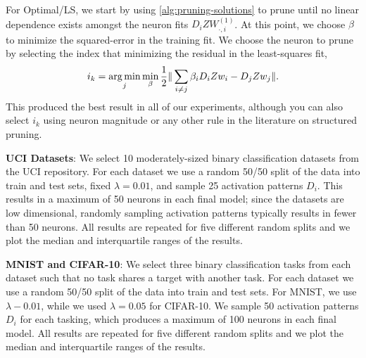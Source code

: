 For Optimal/LS, we start by using \cref{alg:pruning-solutions} to prune
until no linear dependence exists amongst the neuron fits \( D_i Z W^{(1)}_{\cdot, i} \).
At this point, we choose \( \beta \) to minimize the squared-error
in the training fit.
We choose the neuron to prune by selecting the index that minimizing the residual
in the least-squares fit,
\[
    i_k = \mathop{\rm arg\,min}_{j} \min_{\beta}
    \frac 1 2 \|\sum_{i \neq j} \beta_i D_i Z w_i  - D_j Z w_j\|.
\]
This produced the best result in all of our experiments, although you can
also select \( i_k \) using neuron magnitude or any other rule in the literature
on structured pruning.

\textbf{UCI Datasets}:
We select 10 moderately-sized binary classification datasets from the UCI repository.
For each dataset we use a random 50/50 split of the data
into train and test sets,
fixed \( \lambda = 0.01 \), and sample 25
activation patterns \( D_i \).
This results in a maximum of 50 neurons in each final model;
since the datasets are low dimensional, randomly sampling activation patterns
typically results in fewer than 50 neurons.
All results are repeated for five different random splits and we
plot the median and interquartile ranges of the results.

\textbf{MNIST and CIFAR-10}:
We select three binary classification tasks from each dataset such that
no task shares a target with another task.
For each dataset we use a random 50/50 split of the data
into train and test sets.
For MNIST, we use \( \lambda - 0.01 \), while we used \( \lambda = 0.05 \)
for CIFAR-10.
We sample 50 activation patterns \( D_i \) for each tasking,
which produces a maximum of 100 neurons in each final model.
All results are repeated for five different random splits and we
plot the median and interquartile ranges of the results.
